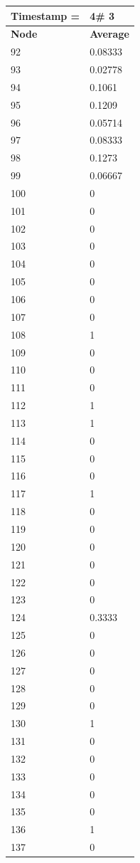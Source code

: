 \begin{tabular}{|l||l|}
\hline
\textbf{Timestamp =} & \textbf{4}\# 3\\\hline
	\textbf{Node} & \textbf{Average} \\ \hline
\hline
	92 & 0.08333 \\ \hline
	93 & 0.02778 \\ \hline
	94 & 0.1061 \\ \hline
	95 & 0.1209 \\ \hline
	96 & 0.05714 \\ \hline
	97 & 0.08333 \\ \hline
	98 & 0.1273 \\ \hline
	99 & 0.06667 \\ \hline
	100 & 0 \\ \hline
	101 & 0 \\ \hline
	102 & 0 \\ \hline
	103 & 0 \\ \hline
	104 & 0 \\ \hline
	105 & 0 \\ \hline
	106 & 0 \\ \hline
	107 & 0 \\ \hline
	108 & 1 \\ \hline
	109 & 0 \\ \hline
	110 & 0 \\ \hline
	111 & 0 \\ \hline
	112 & 1 \\ \hline
	113 & 1 \\ \hline
	114 & 0 \\ \hline
	115 & 0 \\ \hline
	116 & 0 \\ \hline
	117 & 1 \\ \hline
	118 & 0 \\ \hline
	119 & 0 \\ \hline
	120 & 0 \\ \hline
	121 & 0 \\ \hline
	122 & 0 \\ \hline
	123 & 0 \\ \hline
	124 & 0.3333 \\ \hline
	125 & 0 \\ \hline
	126 & 0 \\ \hline
	127 & 0 \\ \hline
	128 & 0 \\ \hline
	129 & 0 \\ \hline
	130 & 1 \\ \hline
	131 & 0 \\ \hline
	132 & 0 \\ \hline
	133 & 0 \\ \hline
	134 & 0 \\ \hline
	135 & 0 \\ \hline
	136 & 1 \\ \hline
	137 & 0 \\ \hline
\end{tabular}

